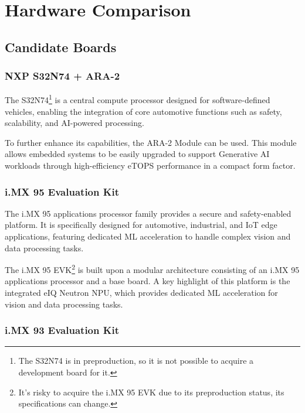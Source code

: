 \chapter{Hardware Comparison}\label{ap:hardware_comparison}

\section{Candidate Boards}

\subsection{NXP S32N74 + ARA-2}

The S32N74\footnote{The S32N74 is in preproduction, so it is not possible to acquire a development board for it.} \cite{S32N7SuperIntegrationProcessor} is a central compute processor designed for software-defined vehicles, enabling the integration of core automotive functions such as safety, scalability, and \gls{AI}-powered processing. 

To further enhance its capabilities, the ARA-2 Module \cite{ARA2} can be used. This module allows embedded systems to be easily upgraded to support Generative \gls{AI} workloads through high-efficiency \gls{eTOPS} performance in a compact form factor.

\subsection{i.MX 95 Evaluation Kit}

The i.MX 95 \cite{IMX95} applications processor family provides a secure and safety-enabled platform. It is specifically designed for automotive, industrial, and \gls{IoT} edge applications, featuring dedicated \gls{ML} acceleration to handle complex vision and data processing tasks.

The i.MX 95 \gls{EVK}\footnote{It's risky to acquire the i.MX 95 \gls{EVK} due to its preproduction status, its specifications can change.} \cite{IMX95EVKQSG} is built upon a modular architecture consisting of an i.MX 95 applications processor and a base board. A key highlight of this platform is the integrated eIQ Neutron \gls{NPU}, which provides dedicated \gls{ML} acceleration for vision and data processing tasks.

\subsection{i.MX 93 Evaluation Kit}

